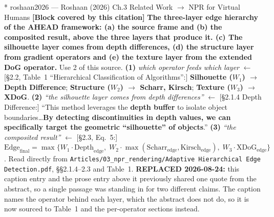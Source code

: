 \documentclass[11pt, a4paper]{article}
\makeatletter
\newcounter{citentry}
\newcommand{\citentry@core}[7]{%
  \stepcounter{citentry}
  \begingroup
  \sbox{\citentry@measurebox}{%
    \begin{minipage}{\linewidth}
      \noindent\colorbox{konstanzblue}{\parbox{\dimexpr\linewidth-2\fboxsep}{%
        \vspace{3pt}
        \textbf{\#\thecitentry \quad #2} \hfill \textit{#3}
        \vspace{3pt}
      }}
      \vspace{3pt}
      \noindent\begin{tabular}{@{}p{2.7cm} p{\dimexpr\linewidth-3cm}@{}}
        \textit{\small Sentence in thesis:} & #4 \\[5pt]
        \textbf{Usage:}\hfill       & #5 \\[5pt]
        \textit{\small Original source:}     & #6 \\[5pt]
        \textbf{How to check:}             & #7 \\
      \end{tabular}
      \vspace{5pt}
      \rule{10pt}{10pt}\quad \textbf{Validated} --- I have read the original and agree it supports the sentence.
    \end{minipage}%
  }%
  \Needspace{\dimexpr\ht\citentry@measurebox+\dp\citentry@measurebox\relax}%
  \endgroup
  \vspace{10pt}
  \noindent\colorbox{konstanzblue}{\parbox{\dimexpr\linewidth-2\fboxsep}{%
    \vspace{3pt}
    \textcolor{white}{\textbf{\#\thecitentry \quad #2}} \hfill \textcolor{white}{\textit{#3}}
    \vspace{3pt}
  }}
  \vspace{3pt}
  \noindent\begin{tabular}{@{}p{2.7cm} p{\dimexpr\linewidth-3cm}@{}}
    \textit{\small Sentence in thesis:} & \textcolor{darkgreen}{#4} \\[5pt]
    \textbf{Usage:}\hfill       & #5 \\[5pt]
    \textit{\small Original source:}     & \textcolor{darkred}{#6} \\[5pt]
    \textbf{How to check:}             & #7 \\
  \end{tabular}
  \vspace{5pt}
  \noindent\CheckBox[name=verified\thecitentry, width=10pt, height=10pt, bordercolor={0 0 0}, borderwidth=0.75, backgroundcolor={1 1 1}#1]{}\quad \textbf{Validated} --- I have read the original and agree it supports the sentence.
  \vspace{3pt}
  \noindent\textcolor{midgray}{\rule{\linewidth}{0.4pt}}
}
\newcommand{\citentry}{\@ifstar{\citentry@core{, checked}}{\citentry@core{}}}
\makeatother
\begin{document}
\begin{Form}
\citentry*
  {roshaan2026 --- Roshaan (2026)}
  {Ch.3 Related Work $\rightarrow$ NPR for Virtual Humans}
  {\textbf{[Block covered by this citation]} \textbf{The three-layer edge hierarchy of the AHEAD framework: (a) the source frame and (b) the composited result, above the three layers that produce it. (c) The silhouette layer comes from depth differences, (d) the structure layer from gradient operators and (e) the texture layer from the extended DoG operator.}}
  {Use 2 of this source.}
  {\textbf{(1)} \emph{which operator feeds which layer} $\leftarrow$ [\S2.2, Table~1 ``Hierarchical Classification of Algorithms'':] \textbf{Silhouette ($W_1$) $\to$ Depth Difference}; \textbf{Structure ($W_2$) $\to$ Scharr, Kirsch}; \textbf{Texture ($W_3$) $\to$ XDoG}. \quad \textbf{(2)} \emph{``the silhouette layer comes from depth differences''} $\leftarrow$ [\S2.1.4 Depth Difference:] ``This method leverages the \textbf{depth buffer} to isolate object boundaries\ldots \textbf{By detecting discontinuities in depth values, we can specifically target the geometric ``silhouette'' of objects}.'' \quad \textbf{(3)} \emph{``the composited result''} $\leftarrow$ [\S2.3, Eq.~5:] $\mathrm{Edge}_{\mathrm{final}} = \max\{W_1\cdot\mathrm{Depth}_{\mathrm{edge}},\; W_2\cdot\max(\mathrm{Scharr}_{\mathrm{edge}},\mathrm{Kirsch}_{\mathrm{edge}}),\; W_3\cdot\mathrm{XDoG}_{\mathrm{edge}}\}$.}
  {Read directly from \texttt{\footnotesize Articles/03\_npr\_rendering/Adaptive Hierarchical Edge Detection.pdf}, \S\S2.1.4--2.3 and Table~1. \textbf{REPLACED 2026-08-24:} this caption entry and the prose entry above it previously shared one quote from the abstract, so a single passage was standing in for two different claims. The caption names the operator behind each layer, which the abstract does not do, so it is now sourced to Table~1 and the per-operator sections instead.}


\end{Form}
\end{document}
